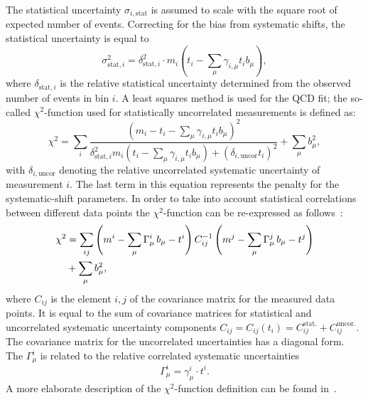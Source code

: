 The statistical uncertainty $\sigma_{i,\text{stat}}$ is assumed to scale with the square root of expected number of events. Correcting for the bias from systematic shifts, the statistical uncertainty is equal to
\begin{equation}
 \sigma_{\text{stat},i}^2 = \delta_{\text{stat},i}^2\cdot m_i\left( t_i - \sum_\mu\gamma_{i,\mu}t_ib_\mu \right),
\end{equation}
where $\delta_{\text{stat},i}$ is the relative statistical uncertainty determined from the observed number of events in bin $i$. A least squares method is used for the QCD fit; the so-called $\chi^2$-function used for statistically uncorrelated measurements is defined as:
\begin{equation}
 \chi^2 = \sum_i{ \frac{\left( m_i-t_i-\sum_{\mu}{\gamma_{i,\mu} t_i b_\mu} \right)^2 }{ \delta_{\text{stat},i}^2 m_i \left( t_i - \sum_\mu{\gamma_{i,\mu}t_ib_\mu} \right)+ \left( \delta_{i,\text{uncor}}t_i\right)^2 } } + \sum_{\mu}{b_\mu^2},
 \label{eq:chi2uncorr}
\end{equation}
with $\delta_{i,\text{uncor}}$ denoting the relative uncorrelated systematic uncertainty of measurement $i$. The last term in this equation represents the penalty for the systematic-shift parameters. In order to take into account statistical correlations between different data points the $\chi^2$-function can be re-expressed as follows~\cite{Aaron:2009aa}:
\begin{align}
 \chi^2 &= \sum_{ij}{\left( m^i -\sum_{\mu}{\Gamma_\mu^i\,b_\mu - t^i }\right) C^{-1}_{ij} \left( m^j -\sum_{\mu}{\Gamma_\mu^j\,b_\mu - t^j }\right) }\notag\\
                                           &+ \sum_{\mu}{b_\mu^2},
 \label{eq:chi2corr}
\end{align}
where $C_{ij}$ is the element $i,j$ of the covariance matrix for the measured data points. It is equal to the sum of covariance matrices for statistical and uncorrelated systematic uncertainty components $C_{ij}=C_{ij}\left(t_i\right)=C_{ij}^{\text{stat.}}+C_{ij}^{\text{uncor.}}$. The covariance matrix for the uncorrelated uncertainties has a diagonal form. The $\Gamma_\mu^i$ is related to the relative correlated systematic uncertainties
\begin{equation}
 \Gamma_{\mu}^i = \gamma_{\mu}^i \cdot t^i. 
\end{equation}
A more elaborate description of the $\chi^2$-function definition can be found in~\cite{herafitter:2014:manual}.

